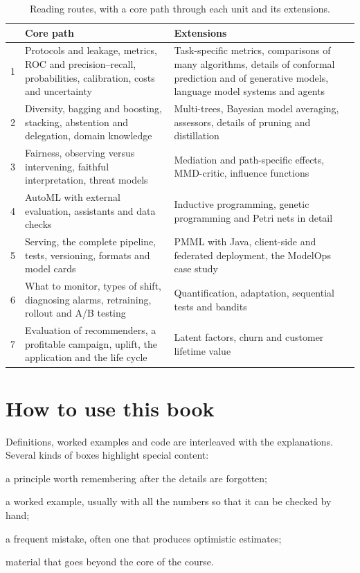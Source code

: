 \begin{table}[htbp]
\centering\small
\caption{Reading routes, with a core path through each unit and its extensions.}\label{tab:routes}
\begin{tabularx}{\textwidth}{@{}l>{\raggedright\arraybackslash}X>{\raggedright\arraybackslash}X@{}}
\toprule
& Core path & Extensions\\
\midrule
1 & Protocols and leakage, metrics, ROC and precision--recall, probabilities, calibration, costs and
uncertainty & Task-specific metrics, comparisons of many algorithms, details of conformal prediction and
of generative models, language model systems and agents\\
2 & Diversity, bagging and boosting, stacking, abstention and delegation, domain knowledge & Multi-trees, Bayesian model
averaging, assessors, details of pruning and distillation\\
3 & Fairness, observing versus intervening, faithful interpretation, threat models & Mediation and
path-specific effects, MMD-critic, influence functions\\
4 & AutoML with external evaluation, assistants and data checks & Inductive programming, genetic
programming and Petri nets in detail\\
5 & Serving, the complete pipeline, tests, versioning, formats and model cards & PMML with Java, client-side and federated deployment, the ModelOps case study\\
6 & What to monitor, types of shift, diagnosing alarms, retraining, rollout and A/B testing & Quantification, adaptation,
sequential tests and bandits\\
7 & Evaluation of recommenders, a profitable campaign, uplift, the application and the life cycle & Latent factors, churn and customer lifetime value\\
\bottomrule
\end{tabularx}
\end{table}


\section*{How to use this book}

Definitions, worked examples and code are interleaved with the explanations. Several kinds of
boxes highlight special content:
\begin{description}[font=\sffamily\bfseries\small]
  \item[Key idea] a principle worth remembering after the details are forgotten;
  \item[Example] a worked example, usually with all the numbers so that it can be checked
        by hand;
  \item[Pitfall] a frequent mistake, often one that produces optimistic estimates;
  \item[Going further] material that goes beyond the core of the course.
\end{description}

